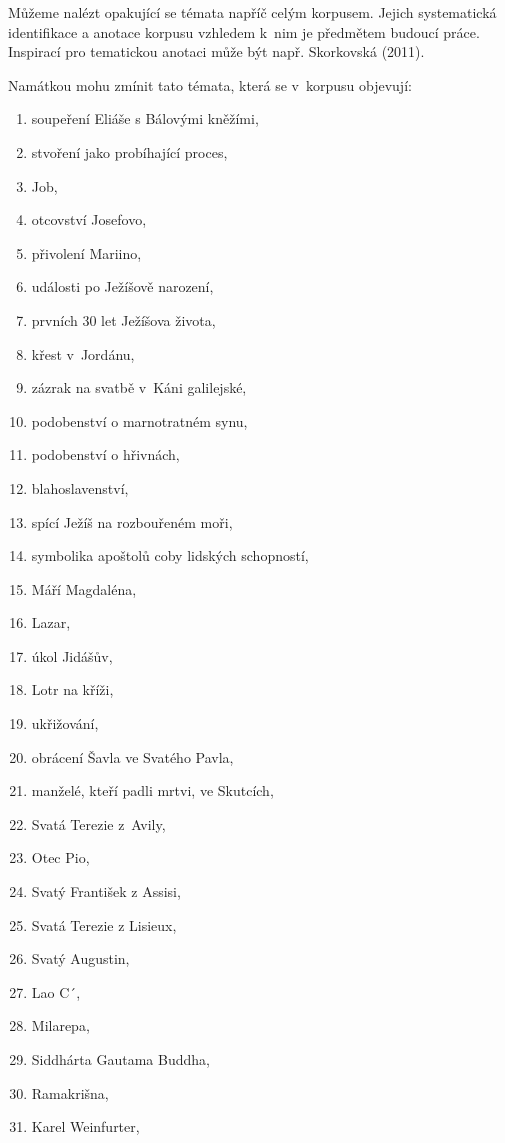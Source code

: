 Můžeme nalézt opakující se témata napříč celým korpusem. Jejich systematická
identifikace a anotace korpusu vzhledem k~nim je předmětem budoucí práce.
Inspirací pro tematickou anotaci může být např. Skorkovská (2011)\cite{skorkovska2011automatic}.

Namátkou mohu zmínit tato témata, která se v~korpusu objevují:

\begin{enumerate}
\item{soupeření Eliáše s Bálovými kněžími,}
\item{stvoření jako probíhající proces,}
\item{Job,}

\item{otcovství Josefovo,}
\item{přivolení Mariino,}
\item{události po Ježíšově narození,}
\item{prvních 30 let Ježíšova života,}
\item{křest v~Jordánu,}
\item{zázrak na svatbě v~Káni galilejské,}
\item{podobenství o marnotratném synu,}
\item{podobenství o hřivnách,}
\item{blahoslavenství,}
\item{spící Ježíš na rozbouřeném moři,}
\item{symbolika apoštolů coby lidských schopností,}
\item{Máří Magdaléna,}
\item{Lazar,}
\item{úkol Jidášův,}
\item{Lotr na kříži,}
\item{ukřižování,}

\item{obrácení Šavla ve Svatého Pavla,}
\item{manželé, kteří padli mrtvi, ve Skutcích,}

\item{Svatá Terezie z~Avily,}
\item{Otec Pio,}
\item{Svatý František z Assisi,}
\item{Svatá Terezie z Lisieux,}
\item{Svatý Augustin,}

\item{Lao C´,}
\item{Milarepa,}
\item{Siddhárta Gautama Buddha,}
\item{Ramakrišna,}
\item{Karel Weinfurter,}


\end{enumerate}
